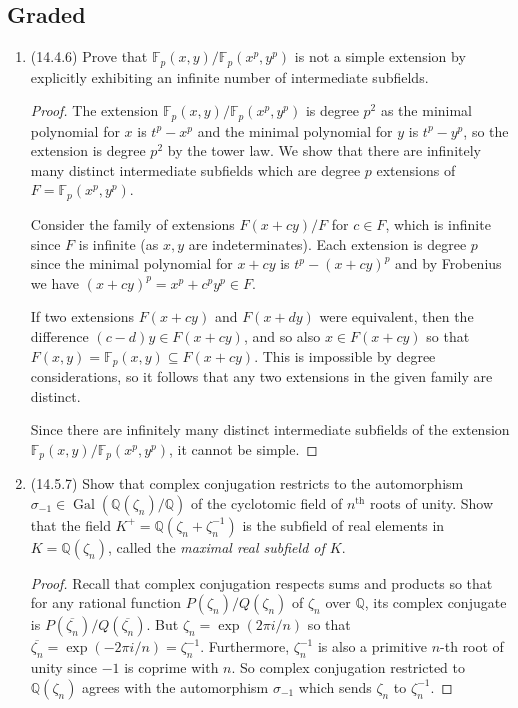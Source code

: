 \documentclass[11pt]{article}
\DeclareMathOperator{\Gal}{Gal}
\begin{document}
\subsection*{Graded}
\begin{enumerate}
    \item (14.4.6) Prove that $\mathbb{F}_p(x,y)/\mathbb{F}_p(x^p,y^p)$ is not a simple extension by explicitly exhibiting an infinite number of intermediate subfields. \begin{proof}
        The extension $\mathbb{F}_p(x,y)/\mathbb{F}_p(x^p,y^p)$ is degree $p^2$ as the minimal polynomial for $x$ is $t^p-x^p$ and the minimal polynomial for $y$ is $t^p-y^p$, so the extension is degree $p^2$ by the tower law. We show that there are infinitely many distinct intermediate subfields which are degree $p$ extensions of $F = \mathbb{F}_p(x^p,y^p)$. 

        Consider the family of extensions $F(x+cy)/F$ for $c\in F$, which is infinite since $F$ is infinite (as $x,y$ are indeterminates). Each extension is degree $p$ since the minimal polynomial for $x+cy$ is $t^p-(x+cy)^p$ and by Frobenius we have $(x+cy)^p = x^p+c^py^p\in F$.
        
        If two extensions $F(x+cy)$ and $F(x+dy)$ were equivalent, then the difference $(c-d)y\in F(x+cy)$, and so also $x\in F(x+cy)$ so that $F(x,y) = \mathbb{F}_p(x,y)\subseteq F(x+cy)$. This is impossible by degree considerations, so it follows that any two extensions in the given family are distinct. 

        Since there are infinitely many distinct intermediate subfields of the extension $\mathbb{F}_p(x,y)/\mathbb{F}_p(x^p,y^p)$, it cannot be simple.
    \end{proof}
    \item (14.5.7) Show that complex conjugation restricts to the automorphism $\sigma_{-1}\in \Gal(\mathbb{Q}(\zeta_n)/\mathbb{Q})$ of the cyclotomic field of $n^\text{th}$ roots of unity. Show that the field $K^+ = \mathbb{Q}(\zeta_n+\zeta_n^{-1})$ is the subfield of real elements in $K = \mathbb{Q}(\zeta_n)$, called the \textit{maximal real subfield of $K$}. \begin{proof}
        Recall that complex conjugation respects sums and products so that for any rational function $P(\zeta_n)/Q(\zeta_n)$ of $\zeta_n$ over $\mathbb{Q}$, its complex conjugate is $P(\overline{\zeta_n})/Q(\overline{\zeta_n})$. But $\zeta_n = \exp(2\pi i /n)$ so that $\overline{\zeta_n} = \exp(-2\pi i /n) = \zeta_n^{-1}$. Furthermore, $\zeta_n^{-1}$ is also a primitive $n$-th root of unity since $-1$ is coprime with $n$. So complex conjugation restricted to $\mathbb{Q}(\zeta_n)$ agrees with the automorphism $\sigma_{-1}$ which sends $\zeta_n$ to $\zeta_n^{-1}$.


\end{proof}
\end{enumerate}
\end{document}

